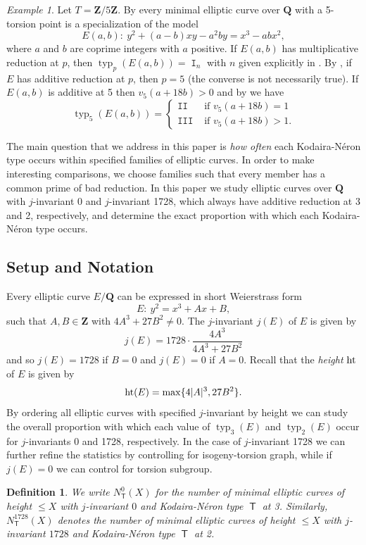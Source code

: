 \documentclass{amsart}
\newcommand{\Z}{\mathbf{Z}}
\newcommand{\Q}{\mathbf{Q}}
\newcommand{\T}{\operatorname{\mathsf{T}}}
\DeclareMathOperator{\height}{\rm ht}
\DeclareMathOperator{\typ}{{typ}}
\DeclareMathOperator{\I}{\mathtt{I}}
\DeclareMathOperator{\II}{\mathtt{II}}
\DeclareMathOperator{\III}{\mathtt{III}}
\numberwithin{equation}{section}
\theoremstyle{plain}
\newtheorem{defn}[equation]{Definition}
\theoremstyle{remark}
\newtheorem{exm}[equation]{Example}
\begin{document}
\begin{exm}
Let $T = \Z/5\Z$.  By \cite[Prop. 2.4, Lem. 2.5]{br} every minimal elliptic curve over $\Q$ with a 5-torsion point is a specialization of the model
\[
E(a,b): \ y^2 + (a-b)xy - a^2by = x^3 - abx^2,
\]
where $a$ and $b$ are coprime integers with $a$ positive.  If $E(a,b)$ has multiplicative reduction at $p$, then $\typ_p(E(a,b)) = \I_n$ with $n$ given explicitly in \cite[Thm.~2]{br_reps}.  By \cite[Thm.~3]{frey}, if $E$ has additive reduction at $p$, then $p=5$ (the converse is not necessarily true).   If $E(a,b)$ is additive at 5 then $v_5(a+18b) >0$ and by \cite[Table 19]{br} we have
\[
\typ_5(E(a,b)) = \begin{cases} \II & \text{ if $v_5(a+18b) =1$} \\ \III & \text{ if $v_5(a+18b) >1.$} \end{cases}
\]
\end{exm}

The main question that we  address in this paper is \emph{how often} each Kodaira-N\'eron type occurs within specified families of elliptic curves.  In order to make interesting comparisons, we choose families such that every member has a common prime of bad reduction.  In this paper we study elliptic curves over $\Q$ with $j$-invariant 0 and $j$-invariant 1728, which always have additive reduction at 3 and 2, respectively, and determine the exact proportion with which each Kodaira-N\'eron type occurs.   

\subsection{Setup and Notation} Every elliptic curve $E/\Q$ can be expressed in short Weierstrass form 
\[
E:~y^2 = x^3 + Ax+B,
\]
such that $A,B \in \Z$ with $4A^3+27B^2 \ne 0$. The $j$-invariant $j(E)$ of $E$ is given by 
\[
j(E) = 1728 \cdot \frac{4A^3}{4A^3 + 27B^2}
\]
and so $j(E) = 1728$ if $B =0$ and $j(E) = 0$ if $A=0$.   Recall that the \emph{height} $\height$ of $E$ is given by
\[
\height (E) = \max \lbrace 4|A|^3, 27B^2 \rbrace.
\]
By ordering all elliptic curves with specified $j$-invariant by height we can study the overall proportion with which each value of $\typ_3(E)$ and $\typ_2(E)$ occur for $j$-invariants 0 and 1728, respectively.  In the case of $j$-invariant 1728 we can further refine the statistics by controlling for isogeny-torsion graph, while if $j(E) = 0$ we can control for torsion subgroup.  

\begin{defn}
We write $N^0_{\T}(X)$ for the number of minimal elliptic curves of height $\leq X$ with $j$-invariant $0$ and Kodaira-N\'eron type $\T$ at 3.  Similarly, $N^{1728}_{\T}(X)$ denotes the number of minimal elliptic curves of height $\leq X$ with $j$-invariant $1728$ and Kodaira-N\'eron type $\T$ at 2.
\end{defn}
\end{document}
